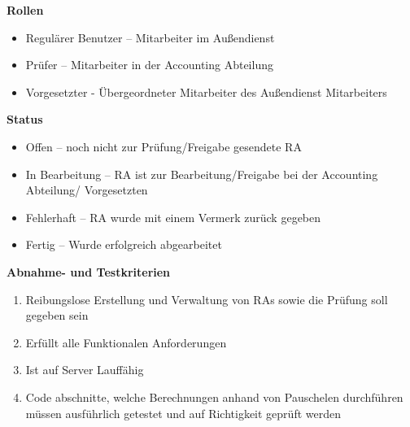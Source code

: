 \textbf{Rollen}
\begin{itemize}
	\item Regulärer Benutzer – Mitarbeiter im Außendienst
	\item Prüfer – Mitarbeiter in der Accounting Abteilung
	\item Vorgesetzter - Übergeordneter Mitarbeiter des Außendienst Mitarbeiters
\end{itemize}

\textbf{Status}
\begin{itemize}
	\item Offen – noch nicht zur Prüfung/Freigabe gesendete RA
	\item In Bearbeitung – RA ist zur Bearbeitung/Freigabe bei der Accounting Abteilung/ Vorgesetzten
	\item Fehlerhaft – RA wurde mit einem Vermerk zurück gegeben
	\item Fertig – Wurde erfolgreich abgearbeitet
\end{itemize}

\textbf{Abnahme- und Testkriterien}
\begin{enumerate}
	\item Reibungslose Erstellung und Verwaltung von RAs sowie die Prüfung soll gegeben sein
	\item Erfüllt alle Funktionalen Anforderungen
	\item Ist auf Server Lauffähig
	\item Code abschnitte, welche Berechnungen anhand von Pauschelen durchführen müssen ausführlich getestet und auf Richtigkeit geprüft werden
\end{enumerate}
